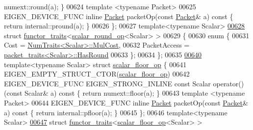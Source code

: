\begin{DoxyCode}
      numext::round(a); \}
00624   \textcolor{keyword}{template} <\textcolor{keyword}{typename} Packet>
00625   EIGEN\_DEVICE\_FUNC \textcolor{keyword}{inline} \hyperlink{union_eigen_1_1internal_1_1_packet}{Packet} packetOp(\textcolor{keyword}{const} \hyperlink{union_eigen_1_1internal_1_1_packet}{Packet}& a)\textcolor{keyword}{ const }\{ \textcolor{keywordflow}{return} internal::pround(a);
       \}
00626 \};
00627 \textcolor{keyword}{template}<\textcolor{keyword}{typename} Scalar>
\hyperlink{struct_eigen_1_1internal_1_1functor__traits_3_01scalar__round__op_3_01_scalar_01_4_01_4}{00628} \textcolor{keyword}{struct }\hyperlink{struct_eigen_1_1internal_1_1functor__traits}{functor\_traits}<\hyperlink{struct_eigen_1_1internal_1_1scalar__round__op}{scalar\_round\_op}<Scalar> >
00629 \{
00630   \textcolor{keyword}{enum} \{
00631     Cost = \hyperlink{group___core___module_struct_eigen_1_1_num_traits}{NumTraits<Scalar>::MulCost},
00632     PacketAccess = \hyperlink{struct_eigen_1_1internal_1_1packet__traits}{packet\_traits<Scalar>::HasRound}
00633   \};
00634 \};
00635 
\hyperlink{struct_eigen_1_1internal_1_1scalar__floor__op}{00640} \textcolor{keyword}{template}<\textcolor{keyword}{typename} Scalar> \textcolor{keyword}{struct }\hyperlink{struct_eigen_1_1internal_1_1scalar__floor__op}{scalar\_floor\_op} \{
00641   EIGEN\_EMPTY\_STRUCT\_CTOR(\hyperlink{struct_eigen_1_1internal_1_1scalar__floor__op}{scalar\_floor\_op})
00642   EIGEN\_DEVICE\_FUNC EIGEN\_STRONG\_INLINE \textcolor{keyword}{const} Scalar operator() (\textcolor{keyword}{const} Scalar& a)\textcolor{keyword}{ const }\{ \textcolor{keywordflow}{return} 
      numext::floor(a); \}
00643   \textcolor{keyword}{template} <\textcolor{keyword}{typename} Packet>
00644   EIGEN\_DEVICE\_FUNC \textcolor{keyword}{inline} \hyperlink{union_eigen_1_1internal_1_1_packet}{Packet} packetOp(\textcolor{keyword}{const} \hyperlink{union_eigen_1_1internal_1_1_packet}{Packet}& a)\textcolor{keyword}{ const }\{ \textcolor{keywordflow}{return} internal::pfloor(a);
       \}
00645 \};
00646 \textcolor{keyword}{template}<\textcolor{keyword}{typename} Scalar>
\hyperlink{struct_eigen_1_1internal_1_1functor__traits_3_01scalar__floor__op_3_01_scalar_01_4_01_4}{00647} \textcolor{keyword}{struct }\hyperlink{struct_eigen_1_1internal_1_1functor__traits}{functor\_traits}<\hyperlink{struct_eigen_1_1internal_1_1scalar__floor__op}{scalar\_floor\_op}<Scalar> >

\end{DoxyCode}
